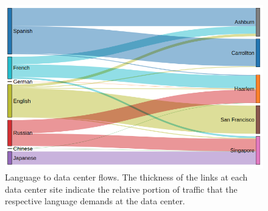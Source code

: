 \begin{figure}[h!]\centering
    \includegraphics[scale=0.4]{embodied_cost_model/images/lang_dc_sankey.png}
    \caption[Language to Data Center Site Sankey Diagram]{Language to data center flows. The thickness of the links at each data center site indicate the relative portion of traffic that the respective language demands at the data center.}
    \label{land_dc_sankey}
    \end{figure}